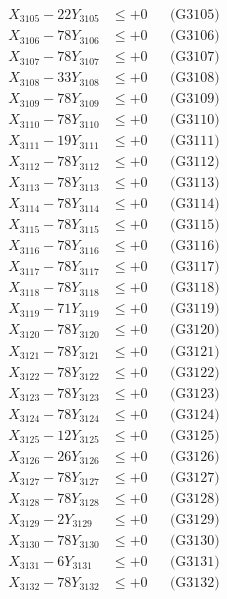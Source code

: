 \documentclass[a4paper,10pt]{article}
\begin{document}
{\begin{align}
X_{3105} - 22Y_{3105} &\leq +0 && \text{(G3105)} \\
X_{3106} - 78Y_{3106} &\leq +0 && \text{(G3106)} \\
X_{3107} - 78Y_{3107} &\leq +0 && \text{(G3107)} \\
X_{3108} - 33Y_{3108} &\leq +0 && \text{(G3108)} \\
X_{3109} - 78Y_{3109} &\leq +0 && \text{(G3109)} \\
X_{3110} - 78Y_{3110} &\leq +0 && \text{(G3110)} \\
\allowbreak
X_{3111} - 19Y_{3111} &\leq +0 && \text{(G3111)} \\
X_{3112} - 78Y_{3112} &\leq +0 && \text{(G3112)} \\
X_{3113} - 78Y_{3113} &\leq +0 && \text{(G3113)} \\
X_{3114} - 78Y_{3114} &\leq +0 && \text{(G3114)} \\
X_{3115} - 78Y_{3115} &\leq +0 && \text{(G3115)} \\
X_{3116} - 78Y_{3116} &\leq +0 && \text{(G3116)} \\
X_{3117} - 78Y_{3117} &\leq +0 && \text{(G3117)} \\
X_{3118} - 78Y_{3118} &\leq +0 && \text{(G3118)} \\
X_{3119} - 71Y_{3119} &\leq +0 && \text{(G3119)} \\
X_{3120} - 78Y_{3120} &\leq +0 && \text{(G3120)} \\
\allowbreak
X_{3121} - 78Y_{3121} &\leq +0 && \text{(G3121)} \\
X_{3122} - 78Y_{3122} &\leq +0 && \text{(G3122)} \\
X_{3123} - 78Y_{3123} &\leq +0 && \text{(G3123)} \\
X_{3124} - 78Y_{3124} &\leq +0 && \text{(G3124)} \\
X_{3125} - 12Y_{3125} &\leq +0 && \text{(G3125)} \\
X_{3126} - 26Y_{3126} &\leq +0 && \text{(G3126)} \\
X_{3127} - 78Y_{3127} &\leq +0 && \text{(G3127)} \\
X_{3128} - 78Y_{3128} &\leq +0 && \text{(G3128)} \\
X_{3129} - 2Y_{3129} &\leq +0 && \text{(G3129)} \\
X_{3130} - 78Y_{3130} &\leq +0 && \text{(G3130)} \\
\allowbreak
X_{3131} - 6Y_{3131} &\leq +0 && \text{(G3131)} \\
X_{3132} - 78Y_{3132} &\leq +0 && \text{(G3132)} \\

\end{align}}
\end{document}
